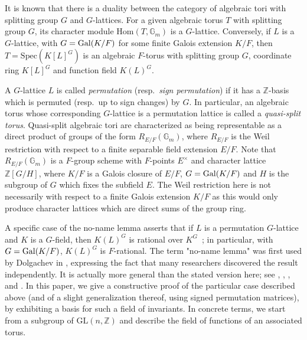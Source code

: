 \documentclass[12pt]{article}
\theoremstyle{plain}
\newcommand{\Z}{\ensuremath{\mathbb{Z}}}
\begin{document}
It is known that there is a duality between the category of algebraic
tori with splitting group $G$ and $G$-lattices. For a given algebraic
torus $T$ with splitting group $G$, its character module
$\mathrm{Hom}(T,\mathbb{G}_m)$ is a $G$-lattice. Conversely, if $L$ is
a $G$-lattice, with $G={\rm Gal}(K/F)$ for some finite Galois
extension $K/F$, then $T=\mathrm{Spec}(K[L]^G)$ is an algebraic
$F$-torus with splitting group $G$, coordinate ring $K[L]^G$ and
function field $K(L)^G$.

A $G$-lattice $L$ is called {\em permutation} (resp.\ {\em sign
  permutation}) if it has a $\Z$-basis which is permuted (resp.\ up to
sign changes) by $G$. In particular, an algebraic torus whose
corresponding $G$-lattice is a permutation lattice is called a {\em
  quasi-split torus}. Quasi-split algebraic tori 
  are characterized as being
representable as a direct product of groups of the form
$R_{E/F}(\mathbb{G}_m)$, where $R_{E/F}$ is the Weil restriction with 
respect to a finite separable field extension $E/F$.
Note that $R_{E/F}(\mathbb{G}_m)$ is a $F$-group scheme with $F$-points $E^{\times}$ and 
character lattice $\Z[G/H]$, where $K/F$ is a Galois closure of $E/F$, $G={\rm Gal}(K/F)$ and $H$ is the 
subgroup of $G$ which fixes the subfield $E$.
The Weil restriction here is not necessarily with respect to a finite Galois extension $K/F$
as this would only produce character lattices which are direct sums of the group ring.


A specific case of the no-name lemma asserts that if $L$ is a
permutation $G$-lattice and $K$ is a $G$-field, then $K(L)^G$ is
rational over $K^G$~\cite[Chapter~9.4]{Lorenz}; in particular, with
$G={\rm Gal}(K/F)$, $K(L)^G$ is $F$-rational. The term "no-name lemma"
was first used by Dolgachev in \cite{Dolgachev}, expressing the fact
that many researchers discovered the result independently. It is
actually more general than the stated version here; see
\cite[p.\ 6]{Dolgachev}, \cite[Section 3.2]{Sansuc}, \cite[Proposition
  1.3]{Lenstra}, \cite[Remark 2.4]{Domokos} and \cite[Proposition
  1.1]{EndoMiyata}.  In this paper, we give a constructive proof of
the particular case described above (and of a slight generalization
thereof, using signed permutation matrices), by exhibiting a basis for
such a field of invariants.  In concrete terms, we start from a
subgroup of $\mathrm{GL}(n,\Z)$ and describe the field of functions of
an associated torus.
\end{document}
